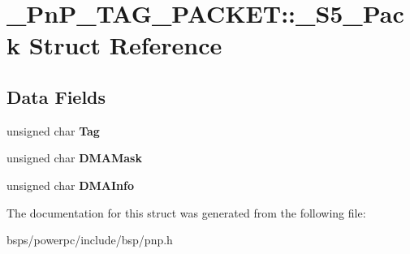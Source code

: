 \hypertarget{struct__PnP__TAG__PACKET_1_1__S5__Pack}{}\section{\+\_\+\+Pn\+P\+\_\+\+T\+A\+G\+\_\+\+P\+A\+C\+K\+ET\+::\+\_\+\+S5\+\_\+\+Pack Struct Reference}
\label{struct__PnP__TAG__PACKET_1_1__S5__Pack}
\subsection*{Data Fields}
\begin{DoxyCompactItemize}
\item 
\mbox{\label{struct__PnP__TAG__PACKET_1_1__S5__Pack_acace9349ad29d7cc3aa19f4cdb9e44a4}} 
unsigned char {\bfseries Tag}
\item 
\mbox{\label{struct__PnP__TAG__PACKET_1_1__S5__Pack_a6b85de9657c7dbb7ed8a64e1948982b9}} 
unsigned char {\bfseries D\+M\+A\+Mask}
\item 
\mbox{\label{struct__PnP__TAG__PACKET_1_1__S5__Pack_ab2aa5578423cee33622a265e4dac67e1}} 
unsigned char {\bfseries D\+M\+A\+Info}
\end{DoxyCompactItemize}


The documentation for this struct was generated from the following file\+:\begin{DoxyCompactItemize}
\item 
bsps/powerpc/include/bsp/pnp.\+h\end{DoxyCompactItemize}

